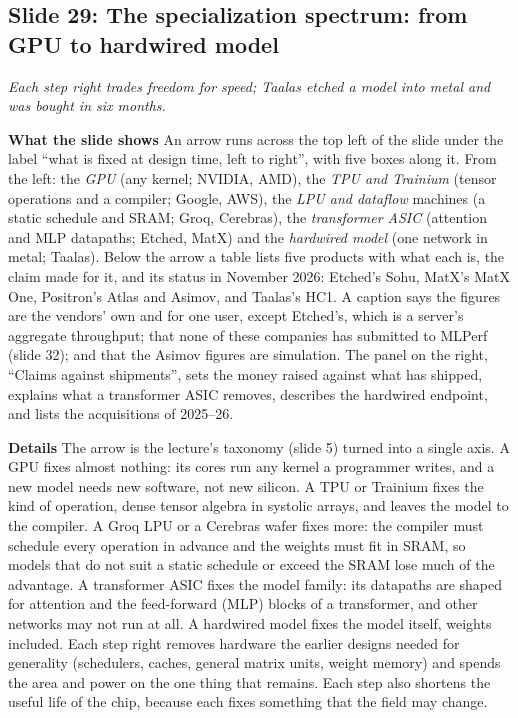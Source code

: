 \documentclass[11pt,letterpaper]{article}
\newcommand{\slide}[3]{%
  \subsection[Slide #1: #2]{Slide #1: #2}%
  {\color{muted}\itshape #3\par}\medskip}
\newcommand{\para}[1]{\medskip\noindent\textbf{#1}\quad}
\begin{document}
\slide{29}{The specialization spectrum: from GPU to hardwired model}{Each step right trades freedom for speed; Taalas etched a model into metal and was bought in six months.}

\para{What the slide shows} An arrow runs across the top left of the slide under the label ``what is fixed at design time, left to right'', with five boxes along it. From the left: the \emph{GPU} (any kernel; NVIDIA, AMD), the \emph{TPU and Trainium} (tensor operations and a compiler; Google, AWS), the \emph{LPU and dataflow} machines (a static schedule and SRAM; Groq, Cerebras), the \emph{transformer ASIC} (attention and MLP datapaths; Etched, MatX) and the \emph{hardwired model} (one network in metal; Taalas). Below the arrow a table lists five products with what each is, the claim made for it, and its status in November 2026: Etched's Sohu, MatX's MatX One, Positron's Atlas and Asimov, and Taalas's HC1. A caption says the figures are the vendors' own and for one user, except Etched's, which is a server's aggregate throughput; that none of these companies has submitted to MLPerf (slide 32); and that the Asimov figures are simulation. The panel on the right, ``Claims against shipments'', sets the money raised against what has shipped, explains what a transformer ASIC removes, describes the hardwired endpoint, and lists the acquisitions of 2025--26.

\para{Details} The arrow is the lecture's taxonomy (slide 5) turned into a single axis. A GPU fixes almost nothing: its cores run any kernel a programmer writes, and a new model needs new software, not new silicon. A TPU or Trainium fixes the kind of operation, dense tensor algebra in systolic arrays, and leaves the model to the compiler. A Groq LPU or a Cerebras wafer fixes more: the compiler must schedule every operation in advance and the weights must fit in SRAM, so models that do not suit a static schedule or exceed the SRAM lose much of the advantage. A transformer ASIC fixes the model family: its datapaths are shaped for attention and the feed-forward (MLP) blocks of a transformer, and other networks may not run at all. A hardwired model fixes the model itself, weights included. Each step right removes hardware the earlier designs needed for generality (schedulers, caches, general matrix units, weight memory) and spends the area and power on the one thing that remains. Each step also shortens the useful life of the chip, because each fixes something that the field may change.
\end{document}
